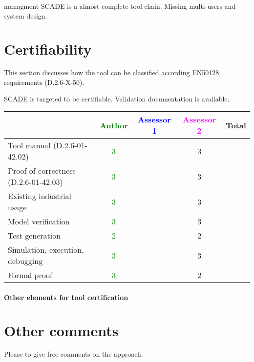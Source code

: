 \begin{assessor2}managment
SCADE is a almost complete tool chain. Missing multi-users and system design.
\end{assessor2}
\section{Certifiability}

This section discusses how the tool can be classified according EN50128 requirements (D.2.6-X-50).

\begin{author_comment}
SCADE is targeted to be certifiable. Validation documentation is available.   
\end{author_comment}


\begin{tabular}{|l | c | c | c | c|}
\hline
& \textcolor{green}{Author} & \textcolor{blue}{Assessor 1} & \textcolor{magenta}{Assessor 2} & Total \\
\hline 
Tool manual (D.2.6-01-42.02) & \textcolor{green}{3} & &3 &  \\
\hline
Proof of correctness (D.2.6-01-42.03)   & \textcolor{green}{3} & &3 & \\
\hline
Existing industrial  usage  & \textcolor{green}{3} & &3 & \\
\hline
Model verification & \textcolor{green}{3} & &3 & \\
\hline
Test generation & \textcolor{green}{2} & &2 & \\
\hline
Simulation, execution, debugging & \textcolor{green}{3} & &3 & \\
\hline
Formal proof & \textcolor{green}{3} & &2 & \\
\hline
\end{tabular}

\paragraph{Other elements for tool certification}

\section{Other comments}
Please to  give free comments on the approach.



